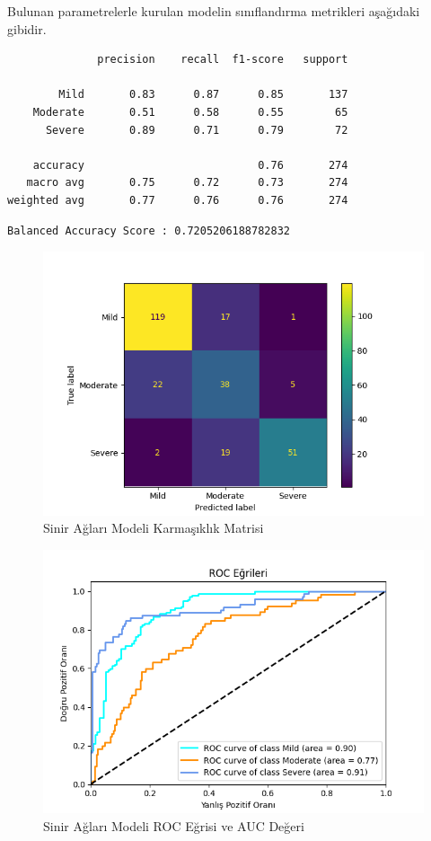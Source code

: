 \documentclass[12pt,twoside]{deuthesis}
\begin{document}
Bulunan parametrelerle kurulan modelin sınıflandırma metrikleri aşağıdaki gibidir.
\begin{verbatim}
              precision    recall  f1-score   support

        Mild       0.83      0.87      0.85       137
    Moderate       0.51      0.58      0.55        65
      Severe       0.89      0.71      0.79        72

    accuracy                           0.76       274
   macro avg       0.75      0.72      0.73       274
weighted avg       0.77      0.76      0.76       274
\end{verbatim}
\begin{verbatim}
Balanced Accuracy Score : 0.7205206188782832
\end{verbatim}
\begin{figure}

{\centering \includegraphics[width=1.05\linewidth,height=0.6\textheight]{figure/nn_conf} 

}

\caption{Sinir Ağları Modeli Karmaşıklık Matrisi}\label{fig:unnamed-chunk-43}
\end{figure}
\begin{figure}

{\centering \includegraphics[width=1.05\linewidth,height=0.6\textheight]{figure/roc_curve_MLPClassifier} 

}

\caption{Sinir Ağları Modeli ROC Eğrisi ve AUC Değeri}\label{fig:unnamed-chunk-44}
\end{figure}
\end{document}

